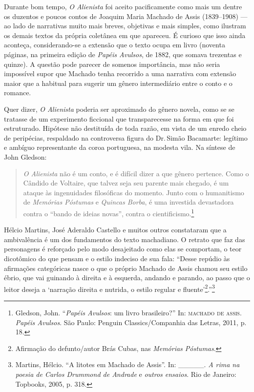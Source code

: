 \noindent{}Durante bom tempo, \emph{O Alienista} foi aceito pacificamente como mais
um dentre os duzentos e poucos contos de Joaquim Maria Machado de Assis
(1839--1908) --- ao lado de narrativas muito mais breves, objetivas e mais
simples, como ilustram os demais textos da própria coletânea em que
apareceu. É curioso que isso ainda aconteça, considerando-se a extensão
que o texto ocupa em livro (noventa páginas, na primeira edição de
\emph{Papéis Avulsos}, de 1882, que somava trezentas e quinze). A
questão pode parecer de somenos importância, mas não seria impossível
supor que Machado tenha recorrido a uma narrativa com extensão maior que
a habitual para sugerir um gênero intermediário entre o conto e o
romance.

Quer dizer, \emph{O Alienista} poderia ser aproximado do gênero novela,
como se se tratasse de um experimento ficcional que transparecesse na
forma em que foi estruturado. Hipótese não destituída de toda razão, em
vista de um enredo cheio de peripécias, respaldado na controversa figura
do Dr.\,Simão Bacamarte: legítimo e ambíguo representante da coroa
portuguesa, na modesta vila. Na síntese de John Gledson:

\begin{quote}
\emph{O Alienista} não é um conto, e é difícil dizer a que gênero
pertence. Como o Cândido de Voltaire, que talvez seja seu parente mais
chegado, é um ataque às ingenuidades filosóficas do momento. Junto com o
humanitismo de \emph{Memórias Póstumas} e \emph{Quincas Borba}, é uma
investida devastadora contra o ``bando de ideias novas'', contra o
cientificismo.\footnote{Gledson, John. ``\emph{Papéis Avulsos}: um livro
  brasileiro?'' In: \textsc{machado de assis}. \emph{Papéis Avulsos}. São Paulo:
  Penguin Classics/Companhia das Letras, 2011, p. 18.}
\end{quote}

Hélcio Martins, José Aderaldo Castello e muitos outros constataram que a
ambivalência é um dos fundamentos do texto machadiano. O retrato que faz
das personagens é reforçado pelo modo desajeitado como elas se
comportam, o teor dicotômico do que pensam e o estilo indeciso de sua
fala: ``Desse repúdio às afirmações categóricas nasce o que o próprio
Machado de Assis chamou seu estilo ébrio, que vai guinando à direita e à
esquerda, andando e parando, ao passo que o leitor deseja a `narração
direita e nutrida, o estilo regular e fluente'\footnote{Afirmação do
  defunto/autor Brás Cubas, nas \emph{Memórias Póstumas}.}.''\footnote{Martins,
  Hélcio. ``A litotes em Machado de Assis''. In: \_\_\_\_\_. \emph{A
  rima na poesia de Carlos Drummond de Andrade} e \emph{outros ensaios}.
  Rio de Janeiro: Topbooks, 2005, p. 318.}

